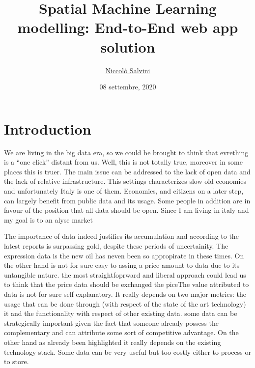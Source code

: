 \documentclass[
  12pt,
  a4paper,
]{book}
\title{Spatial Machine Learning modelling: End-to-End web app solution}
\author{\href{https://niccolosalvini.netlify.app/}{Niccolò Salvini}}
\date{08 settembre, 2020}
\let\oldmaketitle\maketitle
\begin{document}
\maketitle


\newpage

\let\maketitle\oldmaketitle
\maketitle

{
\setcounter{tocdepth}{1}
\tableofcontents
}
\hypertarget{intro}{%
\chapter{Introduction}\label{intro}}

We are living in the big data era, so we could be brought to think that evrething is a ``one click'' distant from us. Well, this is not totally true, moreover in some places this is truer. The main issue can be addressed to the lack of open data and the lack of relative infrastructure. This settings characterizes slow old economies and unfortunately Italy is one of them. Economies, and citizens on a later step, can largely benefit from public data and its usage. Some people in addition are in favour of the position that all data should be open.
Since I am living in italy and my \citep{lovelace_geocomputation_2019} goal is to an \citep{R-furrr} alyse market

The importance of data indeed justifies its accumulation and according to the latest reports is surpassing gold, despite these periods of uncertainity. The expression data is the new oil has neven been so appropirate in these times.
On the other hand is not for sure easy to assing a price amount to data due to its untangible nature.
the most straightfoprward and liberal approach could lead us to think that the price data should be exchanged the piceThe value attributed to data is not for sure self explanatory. It really depends on two major metrics: the usage that can be done through (with respect of the state of the art technology) it and the functionality with respect of other existing data. some data can be strategically important given the fact that someone already possess the complementary and can attribute some sort of competitive advantage. On the other hand as already been highlighted it really depends on the existing technology stack. Some data can be very useful but too costly either to process or to store.
\end{document}
